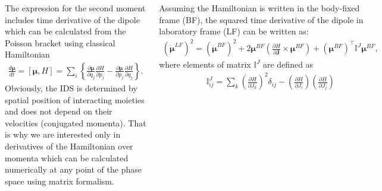 \documentclass[
  20pt,
  a0paper,
  portrait,
  margin=0mm,
  innermargin=15mm,
  blockverticalspace=0mm,
  colspace=0mm,
  subcolspace=0mm
]{tikzposter}
\newcommand{\mf}{\mathbf}
\newcommand{\lb}{\left(}
\newcommand{\rb}{\right)}
\newcommand{\bbI}{\mathbb{I}}
\begin{document}
\begin{columns}
{{The expression for the second moment includes time derivative of the dipole which can be calculated from the Poisson bracket using classical Hamiltonian
\begin{gather}
		\frac{d \boldsymbol{\mu}}{dt} = \left[ \boldsymbol{\mu}, H \right] = \sum_i \left\{ \frac{\partial \boldsymbol{\mu}}{\partial q_j} \frac{\partial H}{\partial p_j} 
		- \frac{\partial \boldsymbol{\mu}}{\partial p_j} \frac{\partial H}{\partial q_j} \right\}. \label{eq:poisson} 
\end{gather}
Obviously, the IDS is determined by spatial position of interacting moieties and does not depend on their velocities (conjugated momenta). That is why we are interested only in derivatives of the Hamiltonian over momenta which can be calculated numerically at any point of the phase space using matrix formalism. \par 
Assuming the Hamiltonian is written in the body-fixed frame (BF), the squared time derivative of the dipole in laboratory frame (LF) can be written as:
\begin{gather}
		\lb \boldsymbol{\dot{\mu}}^{LF} \rb^2 =  \lb \boldsymbol{\dot{\mu}}^{BF} \rb^2 + 2 \boldsymbol{\mu}^{BF} \left( \frac{\partial H}{\partial \mf{J}} \times \boldsymbol{\mu}^{BF} \right) + \lb \boldsymbol{\mu}^{BF} \rb^\top \bbI^J \boldsymbol{\mu}^{BF}, \label{eq:dipole2} 
\end{gather}
where elements of matrix $\bbI^J$ are defined as 
\begin{gather}
\bbI^J_{ij} = \sum_{k} \lb \frac{\partial H}{\partial J_k} \rb^2 \delta_{ij} - \lb \frac{\partial H}{\partial J_i} \rb \lb  \frac{\partial H}{\partial J_j} \rb \label{eq:I_matrix}
\end{gather}

}}
\end{columns}
\end{document}
